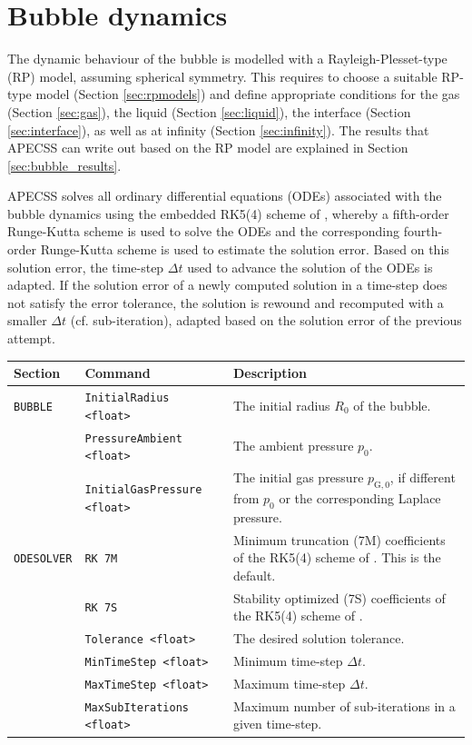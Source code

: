 \chapter{Bubble dynamics}
\label{chap:bubble}
The dynamic behaviour of the bubble is modelled with a Rayleigh-Plesset-type (RP) model, assuming spherical symmetry. This requires to choose a suitable RP-type model (Section \ref{sec:rpmodels}) and define appropriate conditions for the gas  (Section \ref{sec:gas}), the liquid (Section \ref{sec:liquid}), the interface (Section \ref{sec:interface}), as well as at infinity (Section \ref{sec:infinity}). The results that APECSS can write out based on the RP model are explained in Section \ref{sec:bubble_results}.

APECSS solves all ordinary differential equations (ODEs) associated with the bubble dynamics using the embedded RK5(4) scheme of \citet{Dormand1980}, whereby a fifth-order Runge-Kutta scheme is used to solve the ODEs and the corresponding fourth-order Runge-Kutta scheme is used to estimate the solution error. Based on this solution error, the time-step $\Delta t$ used to advance the solution of the ODEs is adapted. If the solution error of a newly computed solution in a time-step does not satisfy the error tolerance, the solution is rewound and recomputed with a smaller $\Delta t$ (cf. sub-iteration), adapted based on the solution error of the previous attempt. 

\vspace{0.8em}

\noindent
\begin{tabular}{p{} p{} p{}}
    \textbf{Section} &\textbf{Command} & \textbf{Description} 
\vspace{1mm} \\ \hline
{\tt BUBBLE} & {\tt InitialRadius <float>} & The initial radius $R_0$ of the bubble.\\ 
 & {\tt PressureAmbient <float>} & The ambient pressure $p_0$.\\ 
 & {\tt InitialGasPressure <float>} & The initial gas pressure $p_{\mathrm{G},0}$, if different from $p_0$ or the corresponding Laplace pressure.\\ 
{\tt ODESOLVER} & {\tt RK 7M} & Minimum truncation (7M) coefficients of the RK5(4) scheme of \citet{Dormand1980}. This is the default.\\ 
& {\tt RK 7S} & Stability optimized (7S) coefficients of the RK5(4) scheme of \citet{Dormand1980}.\\ 
& {\tt Tolerance <float>} & The desired solution tolerance.\\ 
& {\tt MinTimeStep <float>} & Minimum time-step $\Delta t$.\\ 
& {\tt MaxTimeStep <float>} & Maximum time-step $\Delta t$.\\ 
& {\tt MaxSubIterations <float>} & Maximum number of sub-iterations in a given time-step.\\ 
 \hline
\end{tabular} \vspace{1em}

